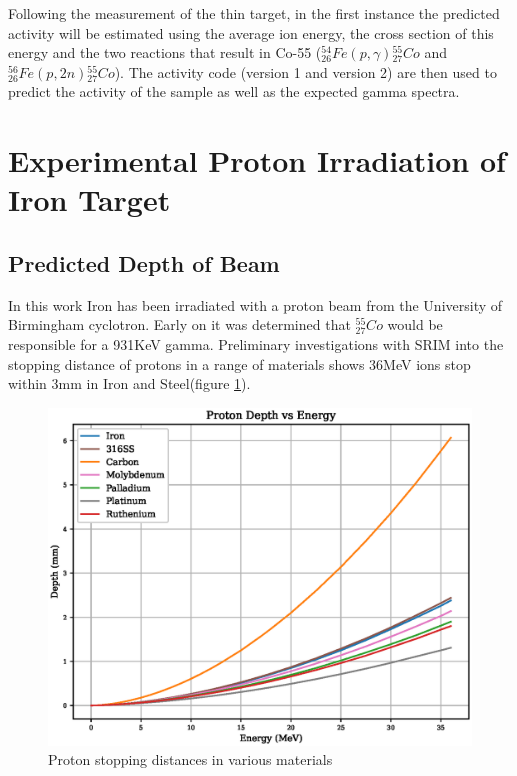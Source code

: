 Following the measurement of the thin target, in the first instance the predicted activity will be estimated using the average ion energy, the cross section of this energy and the two reactions that result in Co-55 (${}^{54}_{26} Fe (p, \gamma) {}^{55}_{27} Co$ and ${}^{56}_{26} Fe (p, 2n) {}^{55}_{27} Co$).  The activity code (version 1 and version 2) are then used to predict the activity of the sample as well as the expected gamma spectra.















\section[Experimental Irradiation - Iron]{Experimental Proton Irradiation of Iron Target}

\subsection{Predicted Depth of Beam}

In this work Iron has been irradiated with a proton beam from the University of Birmingham cyclotron.  Early on it was determined that ${}^{55}_{27}Co$ would be responsible for a 931KeV gamma.  Preliminary investigations with SRIM into the stopping distance of protons in a range of materials shows 36MeV ions stop within 3mm in Iron and Steel(figure \ref{fig:stoppingdistanceprotons}).

\FloatBarrier
\begin{figure}[h]
  \begin{center}
    \includegraphics[width=0.7\linewidth]{chapters/activity_code/proton_stopping.eps}
    \caption{Proton stopping distances in various materials}
    \label{fig:stoppingdistanceprotons}
  \end{center}
\end{figure}

